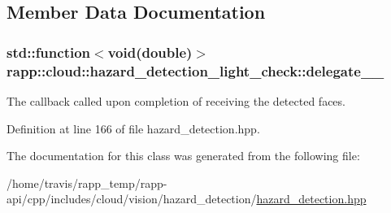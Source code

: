 \subsection{Member Data Documentation}
\hypertarget{classrapp_1_1cloud_1_1hazard__detection__light__check_acdadeca1ce2b179e39073654fa1ba4ac}{
\subsubsection[{delegate\-\_\-\-\_\-}]{\setlength{\rightskip}{0pt plus 5cm}std\-::function$<$void(double)$>$ rapp\-::cloud\-::hazard\-\_\-detection\-\_\-light\-\_\-check\-::delegate\-\_\-\-\_\-\hspace{0.3cm}{\ttfamily [private]}}}\label{classrapp_1_1cloud_1_1hazard__detection__light__check_acdadeca1ce2b179e39073654fa1ba4ac}


The callback called upon completion of receiving the detected faces. 



Definition at line 166 of file hazard\-\_\-detection.\-hpp.



The documentation for this class was generated from the following file\-:\begin{DoxyCompactItemize}
\item 
/home/travis/rapp\-\_\-temp/rapp-\/api/cpp/includes/cloud/vision/hazard\-\_\-detection/\hyperlink{hazard__detection_8hpp}{hazard\-\_\-detection.\-hpp}\end{DoxyCompactItemize}
